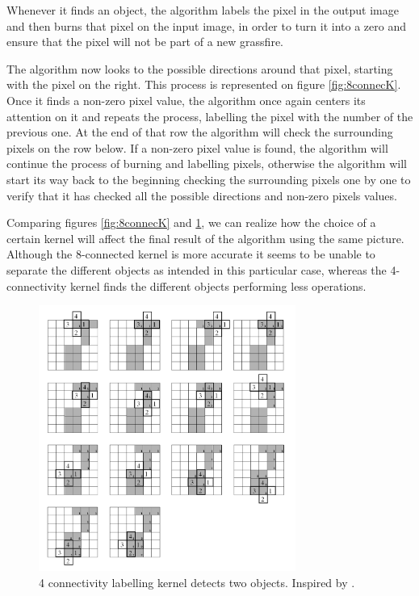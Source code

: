 {Whenever it finds an object, the algorithm labels the pixel in the output image and then burns that pixel on the input image, in order to turn it into a zero and ensure that the pixel will not be part of a new grassfire.

The algorithm now looks to the possible directions around that pixel, starting with the pixel on the right. This process is represented on figure \ref{fig:8connecK}. Once it finds a non-zero pixel value, the algorithm once again centers its attention on it and repeats the process, labelling the pixel with the number of the previous one. At the end of that row the algorithm will check the surrounding pixels on the row below. If a non-zero pixel value is found, the algorithm will continue the process of burning and labelling pixels, otherwise the algorithm will start its way back to the beginning checking the surrounding pixels one by one to verify that it has checked all the possible directions and non-zero pixels values.

Comparing figures \ref{fig:8connecK} and \ref{fig:4connecK}, we can realize how the choice of a certain kernel will affect the final result of the algorithm using the same picture. Although the 8-connected kernel is more accurate it seems to be unable to separate the different objects as intended in this particular case, whereas the 4-connectivity kernel finds the different objects performing less operations.

\begin{figure}[htbp]
\centering
\includegraphics[width=0.75\textwidth]{Pictures/Theory/4connec_kernel.png}
\caption{4 connectivity labelling kernel detects two objects. Inspired by \citep{ip_book}.}
\label{fig:4connecK}
\end{figure}

}
